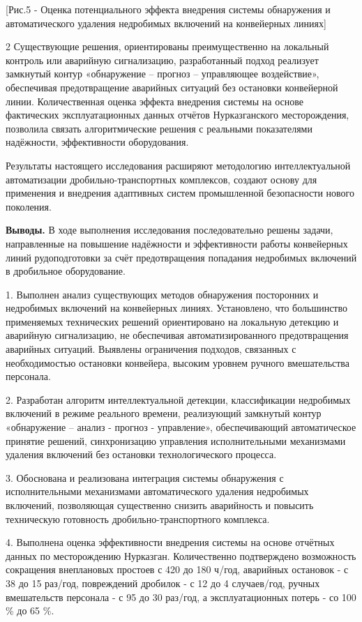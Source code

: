 [Рис.5 - Оценка потенциального эффекта внедрения системы
обнаружения и автоматического удаления недробимых включений на
конвейерных линиях]

\begin{multicols}{2}
Существующие решения, ориентированы преимущественно на локальный
контроль или аварийную сигнализацию, разработанный подход реализует
замкнутый контур «обнаружение -- прогноз -- управляющее воздействие»,
обеспечивая предотвращение аварийных ситуаций без остановки конвейерной
линии. Количественная оценка эффекта внедрения системы на основе
фактических эксплуатационных данных отчётов Нурказганского
месторождения, позволила связать алгоритмические решения с реальными
показателями надёжности, эффективности оборудования.

Результаты настоящего исследования расширяют методологию
интеллектуальной автоматизации дробильно-транспортных комплексов,
создают основу для применения и внедрения адаптивных систем промышленной
безопасности нового поколения.

{\bfseries Выводы.} В ходе выполнения исследования последовательно решены
задачи, направленные на повышение надёжности и эффективности работы
конвейерных линий рудоподготовки за счёт предотвращения попадания
недробимых включений в дробильное оборудование.

1. Выполнен анализ существующих методов обнаружения посторонних и
недробимых включений на конвейерных линиях. Установлено, что большинство
применяемых технических решений ориентировано на локальную детекцию и
аварийную сигнализацию, не обеспечивая автоматизированного
предотвращения аварийных ситуаций. Выявлены ограничения подходов,
связанных с необходимостью остановки конвейера, высоким уровнем ручного
вмешательства персонала.

2. Разработан алгоритм интеллектуальной детекции, классификации
недробимых включений в режиме реального времени, реализующий замкнутый
контур «обнаружение -- анализ - прогноз - управление», обеспечивающий
автоматическое принятие решений, синхронизацию управления
исполнительными механизмами удаления включений без остановки
технологического процесса.

3. Обоснована и реализована интеграция системы обнаружения с
исполнительными механизмами автоматического удаления недробимых
включений, позволяющая существенно снизить аварийность и повысить
техническую готовность дробильно-транспортного комплекса.

4. Выполнена оценка эффективности внедрения системы на основе отчётных
данных по месторождению Нурказган. Количественно подтверждено
возможность сокращения внеплановых простоев с 420 до 180 ч/год,
аварийных остановок - с 38 до 15 раз/год, повреждений дробилок - с 12 до
4 случаев/год, ручных вмешательств персонала - с 95 до 30 раз/год, а
эксплуатационных потерь - со 100 \% до 65 \%.


\end{multicols}
